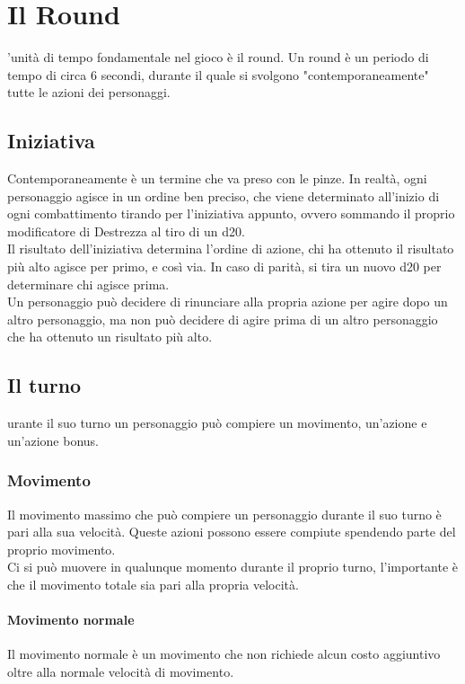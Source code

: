\section{Il Round}
'unità di tempo fondamentale nel gioco è il round. Un round è un periodo di tempo di circa 6 secondi, durante il quale si svolgono "contemporaneamente" tutte le azioni dei personaggi.\\

\subsection{Iniziativa}
Contemporaneamente è un termine che va preso con le pinze. In realtà, ogni personaggio agisce in un ordine ben preciso, che viene determinato all'inizio di ogni combattimento tirando per l'iniziativa appunto, ovvero sommando il proprio modificatore di Destrezza al tiro di un d20. \\ Il risultato dell'iniziativa determina l'ordine di azione, chi ha ottenuto il risultato più alto agisce per primo, e così via. In caso di parità, si tira un nuovo d20 per determinare chi agisce prima.\\ Un personaggio può decidere di rinunciare alla propria azione per agire dopo un altro personaggio, ma non può decidere di agire prima di un altro personaggio che ha ottenuto un risultato più alto.\\ 

\subsection{Il turno}
urante il suo turno un personaggio può compiere un movimento, un'azione e un'azione bonus.\\

\subsubsection{Movimento}
Il movimento massimo che può compiere un personaggio durante il suo turno è pari alla sua velocità. Queste azioni possono essere compiute spendendo parte del proprio movimento.\\ Ci si può muovere in qualunque momento durante il proprio turno, l'importante è che il movimento totale sia pari alla propria velocità.\\
\paragraph{Movimento normale}
Il movimento normale è un movimento che non richiede alcun costo aggiuntivo oltre alla normale velocità di movimento.\\
